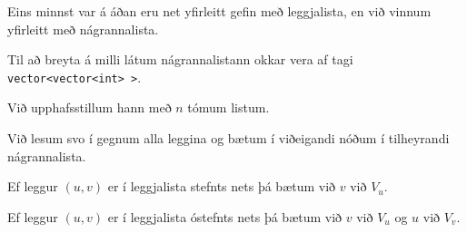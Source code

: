 {
	{
		\item<1-> Eins minnst var á áðan eru net yfirleitt gefin með leggjalista, en við vinnum yfirleitt með nágrannalista.
		\item<2-> Til að breyta á milli látum nágrannalistann okkar vera af tagi \texttt{vector<vector<int>\!\!\!\! >}.
		\item<3-> Við upphafsstillum hann með $n$ tómum listum.
		\item<4-> Við lesum svo í gegnum alla leggina og bætum í viðeigandi nóðum í tilheyrandi nágrannalista.
		\item<5-> Ef leggur $(u, v)$ er í leggjalista stefnts nets þá bætum við $v$ við $V_u$.
		\item<5-> Ef leggur $(u, v)$ er í leggjalista óstefnts nets þá bætum við $v$ við $V_u$ og $u$ við $V_v$.
	}
}

{
}

{
}



